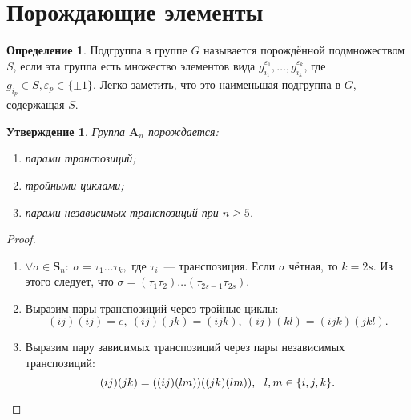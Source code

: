 \documentclass[a4paper, 14pt]{extarticle}
\newcommand{\symmetrical}{\mathbf{S}}
\newcommand{\alternating}{\mathbf{A}}
\renewcommand{\epsilon}{\varepsilon} %
\theoremstyle{definition}
\newtheorem{definition}{Определение}
\theoremstyle{plain}
\numberwithin{theorem}{section}
\numberwithin{definition}{section}
\newtheorem{statement}{Утверждение}
\numberwithin{statement}{section}
\numberwithin{lemma}{section}
\numberwithin{consequence}{section}
\begin{document}
        \section{Порождающие элементы}
        \setcounter{definition}{0}
        \begin{definition}
            Подгруппа в группе $G$ называется порождённой подмножеством $S$, если эта группа
            есть множество элементов вида ${g_{i_1}^{\epsilon_1},\ldots,g_{i_k}^{\epsilon_k}}$, где ${g_{i_p} \in S, \epsilon_p \in \{\pm1\}.}$ Легко заметить, что это наименьшая подгруппа в $G$, содержащая $S$.
        \end{definition}
        \begin{statement}
            Группа $\alternating_n$ порождается:
            \
            \begin{enumerate}
            \setlength\itemsep{0.1em}
                \item парами транспозиций; 
                \item тройными циклами;
                \item парами независимых транспозиций при $n \geqslant 5$.
            \end{enumerate}
        \end{statement}
        \begin{proof}
            \
            \begin{enumerate}
            \setlength\itemsep{0.1em}
                \item ${\forall \sigma \in \symmetrical_n{:} \ \sigma = \tau_1 \ldots \tau_k,}$ где $\tau_i$~--- транспозиция. Если $\sigma$ чётная, то ${k = 2s.}$ Из этого следует, что ${\sigma = (\tau_1 \tau_2)\ldots(\tau_{2s-1}\tau_{2s}).}$
                \item Выразим пары транспозиций через тройные циклы:
                \begin{equation*}
                    (ij)(ij) = e, \ (ij)(jk) = (ijk), \ (ij)(kl) = (ijk)(jkl).
                \end{equation*}
                \item Выразим пару зависимых транспозиций через пары независимых транспозиций:
                \begin{equation*}
                    (ij)(jk) = ((ij)(lm))((jk)(lm)), \ \ l,m \in \{i, j, k\}. \qedhere
                \end{equation*}
            \end{enumerate}
        \end{proof}
\end{document}
